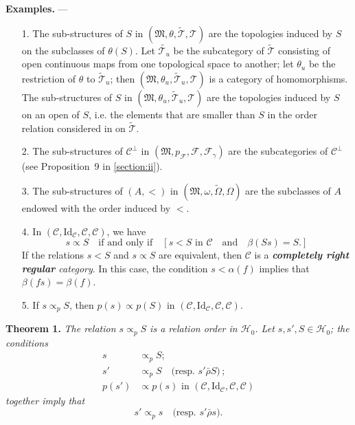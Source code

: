 \documentclass[fleqn]{article}
\newenvironment{itenv}[1]
  {\phantomsection\par\medskip\noindent\textbf{#1.}\itshape}
  {\par\medskip}
\newenvironment{rmenv}[1]
  {\phantomsection\par\medskip\noindent\textbf{#1.}\rmfamily}
  {\par\medskip}
\newcommand{\oldpage}[1]{\marginpar{\footnotesize$\Big\vert$ \textit{p.~#1}}}
\newcommand{\unsure}[1]{{\color{purple}\textbf{#1}}}
\newcommand{\CC}{\mathcal{C}}
\newcommand{\HH}{\mathcal{H}}
\newcommand{\MM}{\mathfrak{M}}
\newcommand{\FF}{\mathcal{F}}
\newcommand{\TT}{\mathcal{T}}
\newcommand{\relrhobar}{\mathrel{\bar{\rho}}}
\newcommand{\subs}{\mathrel{\propto}}
\newcommand{\Id}{\mathrm{Id}}
\begin{document}
\begin{rmenv}{Examples}
  ---
  \begin{enumerate}
    \item[1.]
      The sub-structures of $S$ in $(\MM,\theta,\widetilde{\TT},\TT)$ are the topologies induced by $S$ on the subclasses of $\theta(S)$.
      Let $\widetilde{\TT_u}$ be the subcategory of $\widetilde{\TT}$ consisting of open continuous maps from one topological space to another;
      let $\theta_u$ be the restriction of $\theta$ to $\widetilde{\TT}_u$;
      then $(\MM,\theta_u,\widetilde{\TT}_u,\TT)$ is a category of homomorphisms.
      The sub-structures of $S$ in $(\MM,\theta_u,\widetilde{\TT}_u,\TT)$ are the topologies induced by $S$ on an open of $S$, i.e. the elements that are smaller than $S$ in the order relation considered in \cite{3c} on $\widetilde{\TT}$.
    \item[2.]
      The sub-structures of $\CC^\perp$ in $(\MM,p_\FF,\FF,\FF_\gamma)$ are the subcategories of $\CC^\perp$ (see Proposition~9 in \cref{section:ii}).
    \item[3.]
      The sub-structures of $(A,<)$ in $(\MM,\omega,\widetilde{\Omega},\Omega)$ are the subclasses of $A$ endowed with the order induced by $<$.
    \item[4.]
      In $(\CC,\Id_\CC,\CC,\CC)$, we have
      \[
        s\subs S
        \quad\text{if and only if}\quad
        [
          \text{$s<S$ in $\CC$}
          \quad\text{and}\quad
          \beta(Ss)=S.
        ]
      \]
      If the relations $s<S$ and $s\subs S$ are equivalent, then $\CC$ is a \emph{\unsure{completely right regular} category}.
      In this case, the condition $s<\alpha(f)$ implies that $\beta(fs)=\beta(f)$.
    \item[5.]
      If $s\subs_p S$, then $p(s)\subs p(S)$ in $(\CC,\Id_\CC,\CC,\CC)$.
  \end{enumerate}
\end{rmenv}

\begin{itenv}{Theorem 1}
  \oldpage{362}
  The relation $s\subs_p S$ is a relation order in $\HH_0$.
  Let $s,s',S\in\HH_0$;
  the conditions
  \[
    \begin{aligned}
      s&\subs_p S;
    \\s'&\subs_p S
      \quad\text{(resp. $s'\relrhobar S$)}\,;
    \\p(s')&\subs p(s)\text{ in }(\CC,\Id_\CC,\CC,\CC)
    \end{aligned}
  \]
  together imply that
  \[
    s'\subs_p s
    \quad\text{(resp. $s'\relrhobar s$)}.
  \]
\end{itenv}
\end{document}
